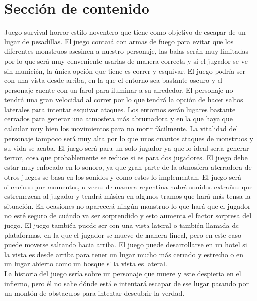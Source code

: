 \documentclass{article}
\begin{document}
\section{Sección de contenido} \label{contenido}
Juego survival horror estilo noventero que tiene como objetivo de escapar de un lugar de pesadillas. El juego contará con armas de fuego para evitar que los diferentes monstruos asesinen a nuestro personaje, las balas serán muy limitadas por lo que será muy conveniente usarlas de manera correcta y si el jugador se ve sin munición, la única opción que tiene es correr y esquivar. El juego podría ser con una vista desde arriba, en la que el entorno sea bastante oscuro y el personaje cuente con un farol para iluminar a su alrededor. El personaje no tendrá una gran velocidad al correr por lo que tendrá la opción de hacer saltos laterales para intentar esquivar ataques. Los entornos serán lugares bastante cerrados para generar una atmosfera más abrumadora y en la que haya que calcular muy bien los movimientos para no morir fácilmente. La vitalidad del personaje tampoco será muy alta por lo que unos cuantos ataques de monstruos y su vida se acaba. El juego será para un solo jugador ya que lo ideal sería generar terror, cosa que probablemente se reduce si es para dos jugadores. El juego debe estar muy enfocado en lo sonoro, ya que gran parte de la atmosfera aterradora de otros juegos se basa en los sonidos y como estos lo implementan. El juego será silencioso por momentos, a veces de manera repentina habrá sonidos extraños que estremezcan al jugador y tendrá música en algunos tramos que hará más tensa la situación. En ocasiones no aparecerá ningún monstruo lo que hará que el jugador no esté seguro de cuándo va ser sorprendido y esto aumenta el factor sorpresa del juego. El juego también puede ser con una vista lateral o también llamada de plataformas, en la que el jugador se mueve de manera lineal, pero en este caso puede moverse saltando hacia arriba. El juego puede desarrollarse en un hotel si la vista es desde arriba para tener un lugar mucho más cerrado y estrecho o en un lugar abierto como un bosque si la vista es lateral.\\ La historia del juego sería sobre un personaje que muere y este despierta en el infierno, pero él no sabe dónde está e intentará escapar de ese lugar pasando por un montón de obstaculos para intentar descubrir la verdad.
\end{document}

